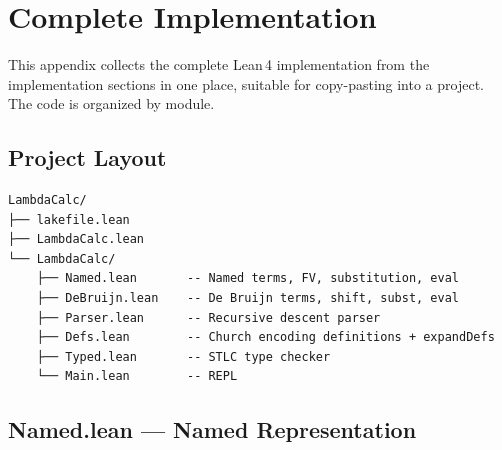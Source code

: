 \documentclass[11pt,a4paper]{article}
\theoremstyle{definition}
\begin{document}
\newpage
\section{Complete Implementation}\label{app:code}

This appendix collects the complete Lean\,4 implementation from the implementation sections in one
place, suitable for copy-pasting into a project. The code is organized by
module.

\subsection*{Project Layout}

\begin{verbatim}
LambdaCalc/
├── lakefile.lean
├── LambdaCalc.lean
└── LambdaCalc/
    ├── Named.lean       -- Named terms, FV, substitution, eval
    ├── DeBruijn.lean    -- De Bruijn terms, shift, subst, eval
    ├── Parser.lean      -- Recursive descent parser
    ├── Defs.lean        -- Church encoding definitions + expandDefs
    ├── Typed.lean       -- STLC type checker
    └── Main.lean        -- REPL
\end{verbatim}

\subsection*{Named.lean --- Named Representation}
\end{document}
